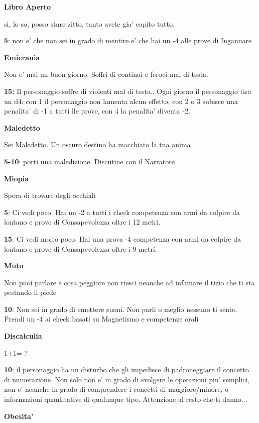 \documentclass[a4paper,11pt,twoside,openany]{book}
\begin{document}
{		\textbf{Libro Aperto}
		
		si, lo so, posso stare zitto, tanto avete gia' capito tutto.
		
		\textbf{5}: non e' che non sei in grado di mentire e' che hai un -4 alle prove di Ingannare
		
		\textbf{Emicrania}
		
		Non e' mai un buon giorno. Soffri di continui e feroci mal di testa.
		
		\textbf{15:} Il personaggio soffre di violenti mal di testa.. Ogni giorno il personaggio tira un d4: con 1 il personaggio non lamenta alcun effetto, con 2 o 3 subisce una penalita' di -1 a tutti lle prove, con 4 la penalita' diventa -2.
		
		\textbf{Maledetto}
		
		Sei Maledetto. Un oscuro destino ha macchiato la tua anima
		
		\textbf{5-10}: porti una maledizione. Discutine con il Narratore
		
		\textbf{Miopia}
		
		Spera di trovare degli occhiali
		
		\textbf{5}: Ci vedi poco. Hai un -2 a tutti i check competenza con armi da colpire da lontano e prove di Consapevolezza oltre i 12 metri.
		
		\textbf{15}: Ci vedi molto poco. Hai una prova -4 competenza con armi da colpire da lontano e prove di Consapevolezza oltre i 9 metri. 
		
		\textbf{Muto}
		
		Non puoi parlare e cosa peggiore non riesci neanche ad infamare il
		tizio che ti sta pestando il piede
		
		\textbf{10}: Non sei in grado di emettere suoni. Non parli o meglio nessuno ti sente. Prendi un -4 ai check basati su Magnetismo e competenze orali
		
		\textbf{Discalculia}
		
		1+1= ?
		
		\textbf{10}: il personaggio ha un disturbo che gli impedisce di padroneggiare il concetto di numerazione. Non solo non e' in grado di svolgere le operazioni piu' semplici, non e' neanche in grado di comprendere i concetti di maggiore/minore, o informazioni quantitative di qualunque tipo. 
		Attenzione al resto che ti danno...
		
		\textbf{Obesita'}
		
}
\end{document}
